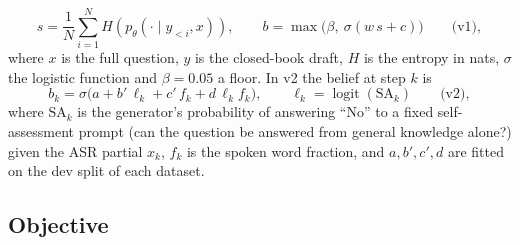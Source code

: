 \begin{equation}
s=\frac{1}{N}\sum_{i=1}^{N}H\!\left(p_\theta(\cdot\mid y_{<i},x)\right),\qquad
b=\max\!\big(\beta,\ \sigma(w\,s+c)\big)\qquad\text{(v1)},
\label{eq:belief}
\end{equation}
where $x$ is the full question, $y$ is the closed-book draft, $H$ is the
entropy in nats, $\sigma$ the logistic function and $\beta=0.05$ a floor.
In v2 the belief at step $k$ is
\begin{equation}
b_k=\sigma\!\big(a+b'\,\ell_k+c'\,f_k+d\,\ell_k f_k\big),\qquad
\ell_k=\operatorname{logit}(\mathrm{SA}_k)\qquad\text{(v2)},
\label{eq:belief-v2}
\end{equation}
where $\mathrm{SA}_k$ is the generator's probability of answering ``No''
to a fixed self-assessment prompt (can the question be answered from
general knowledge alone?) given the ASR partial $x_k$, $f_k$ is the spoken
word fraction, and $a,b',c',d$ are fitted on the dev split of each dataset.

\subsection{Objective}\label{sec:objective}

